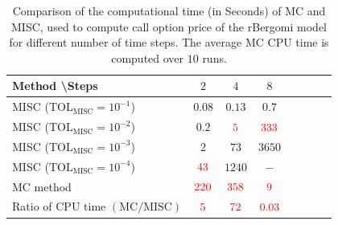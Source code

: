 \begin{table}[htbp]
	\centering
	\begin{tabular}{l*{6}{c}r}
		Method \textbackslash  Steps            & $2$ & $4$ & $8$   \\
		\hline
		MISC ($\text{TOL}_{\text{MISC}}=10^{-1}$)  & $0.08$ & $0.13$ & $0.7$   \\
		MISC ($\text{TOL}_{\text{MISC}}=10^{-2}$)  & $0.2$& ${\color{red}5}$ & ${\color{red}333}$   \\
		MISC ($\text{TOL}_{\text{MISC}}=10^{-3}$)  &  $2$ & $73$ & $3650$  \\		
		MISC ($\text{TOL}_{\text{MISC}}=10^{-4}$)  & ${\color{red}43}$ & $1240$ & $-$  \\	
	
		\hline
		MC method & ${\color{red}220}$  & ${\color{red}358}$  & ${\color{red}9}$  \\
		\hline	
		Ratio of CPU time  $\left(\text{MC}/ \text{MISC} \right)$  &${\color{red}5}$ & ${\color{red}   72 
		}$  & ${\color{red}  0.03	}$   \\
		\hline
	\end{tabular}
	\caption{Comparison of the computational time (in Seconds) of  MC and MISC, used to compute call option price of the rBergomi model for different number of time steps. The
		average MC CPU time is computed over $10$ runs.}
	\label{Comparsion of the computational time of  MC and MISC, used to compute Call option price of rBergomi model for different number of time steps. Case $K=1, H=0.07$, linear}
\end{table}
\FloatBarrier

